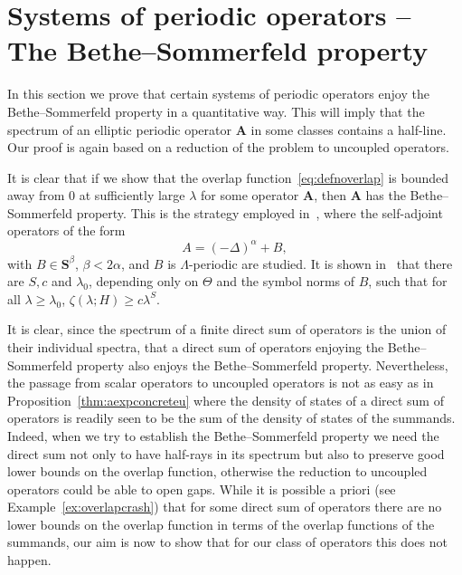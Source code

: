 \documentclass[AHL,Unicode,longabstracts,published]{cedram}
\newcommand{\BA}{\mathbf A}
\newcommand{\BS}{\mathbf S}
\begin{document}
\section{Systems of periodic operators -- The Bethe--Sommerfeld property}\label{sec:bs}


In this section we prove that certain systems of periodic operators enjoy the Bethe--Sommerfeld property in a quantitative way. This will imply that the spectrum of an elliptic periodic operator $\BA$ in some classes contains a half-line. Our proof is again based on a reduction of the problem to uncoupled operators.

It is clear that if we show that the overlap function~\eqref{eq:defnoverlap} is bounded away from $0$ at sufficiently large $\lambda$ for some operator $\BA$, then $\BA$ has the Bethe--Sommerfeld property. This is the strategy employed in~\cite{ParSob2010}, where the self-adjoint operators of the form
\begin{equation}
A = (-\Delta)^\alpha + B,
\end{equation}
with $B\in \BS^\beta$, $\beta < 2\alpha$, and $B$ is $\Lambda$-periodic are studied. It is shown in~\cite{ParSob2010} that there are $S, c$ and $\lambda_0$, depending only on $\Theta$ and the symbol norms of $B$, such that for all $\lambda \ge \lambda_0$, $\zeta(\lambda;H) \ge c
\lambda^S$.

It is clear, since the spectrum of a finite direct sum of operators is the union of their individual spectra, that a direct sum of operators enjoying the Bethe--Sommerfeld property also enjoys the Bethe--Sommerfeld property. Nevertheless, the passage from scalar operators to uncoupled operators is not as easy as in Proposition~\ref{thm:aexpconcreteu} where the density of states of a direct sum of operators is readily seen to be the sum of the density of states of the summands. Indeed, when we try to establish the Bethe--Sommerfeld property we need the direct sum not only to have half-rays in its spectrum but also to preserve good lower bounds on the overlap function, otherwise the reduction to uncoupled operators could be able to open gaps. While it is possible a priori (see Example~\ref{ex:overlapcrash}) that for some direct sum of operators there are no lower bounds on the overlap function in terms of the overlap functions of the summands, our aim is now to show that for our class of operators this does not happen.
\end{document}
